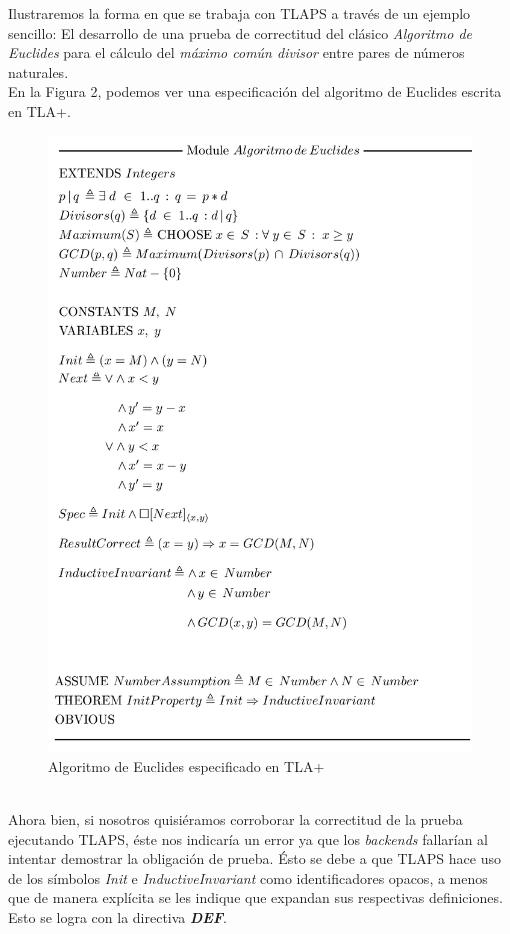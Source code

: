 \documentclass[spanish]{llncs}
\begin{document}
Ilustraremos la forma en que se trabaja con TLAPS a través de un ejemplo sencillo: 
El desarrollo de una prueba de correctitud del clásico \textit{Algoritmo de Euclides} para el cálculo del \textit{máximo común divisor} entre pares de números naturales.
  \\
En la Figura 2, podemos ver una especificación del algoritmo de Euclides escrita en TLA+.
  \begin{figure}
    \includegraphics[scale=0.27]{euclid}
    \caption{Algoritmo de Euclides especificado en TLA+}   
  \end{figure}
\\
Ahora bien, si nosotros quisiéramos corroborar la correctitud de la prueba ejecutando TLAPS, éste nos indicaría un error ya que los \textit{backends} fallarían al intentar demostrar la obligación de prueba. Ésto se debe a que TLAPS
hace uso de los símbolos \textit{Init} e \textit{InductiveInvariant} como identificadores opacos, a menos que de manera explícita se les indique que expandan sus respectivas definiciones. Esto se logra con la directiva \textbf{\textit{DEF}}. 
\\
\end{document}

